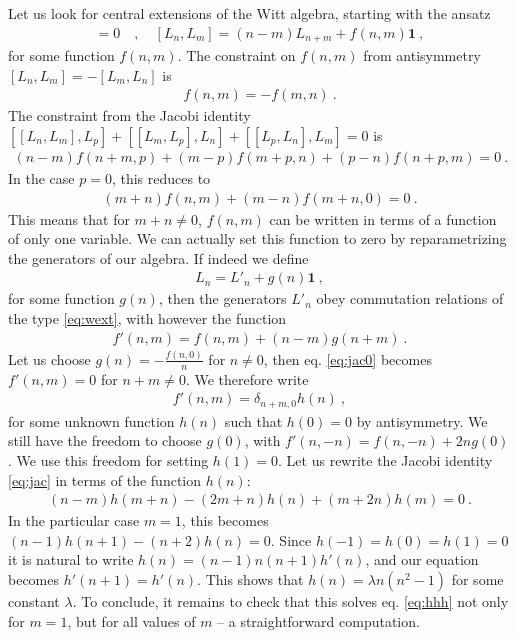 \documentclass[12pt, a4paper]{article}
\theoremstyle{break}
\begin{document}
Let us look for central extensions of the Witt algebra, starting with the ansatz
\begin{align}
  [\mathbf 1, L_n] = 0 \quad , \quad [L_n,L_m] = (n-m)L_{n+m} +f(n,m)\mathbf 1 \ ,
  \label{eq:wext}
 \end{align}
for some function $f(n,m)$. The constraint on $f(n,m)$ from antisymmetry $[L_n,L_m]=-[L_m,L_n]$ is 
\begin{align}
 f(n,m)= - f(m,n)\ .
\end{align}
The constraint from the Jacobi identity $[[L_n,L_m],L_p] + [[L_m,L_p],L_n] + [[L_p,L_n],L_m]=0$ is 
\begin{align}
 (n-m)f(n+m,p) + (m-p)f(m+p,n) + (p-n)f(n+p,m) = 0 \ .
 \label{eq:jac}
\end{align}
In the case $p=0$, this reduces to
\begin{align}
 (m+n)f(n,m)+(m-n)f(m+n,0)=0\ .
 \label{eq:jac0}
\end{align}
This means that for $m+n\neq 0$, $f(n,m)$ can be written in terms of a function of only one variable. We can actually set this function to zero by reparametrizing the generators of our algebra. If indeed we define 
\begin{align}
 L_n = L'_n + g(n) \mathbf 1\ ,
\end{align}
for some function $g(n)$, then the generators $L'_n$ obey commutation relations of the type \eqref{eq:wext}, with however the function 
\begin{align}
 f'(n,m) = f(n, m)+(n-m)g(n+m)\ .
\end{align}
Let us choose $g(n) = -\frac{f(n,0)}{n}$ for $n\neq 0$, then eq. \eqref{eq:jac0} becomes $f'(n,m)=0$ for $n+m\neq 0$. We therefore write 
\begin{align}
 f'(n,m) = \delta_{n+m,0}h(n)\ , 
\end{align}
for some unknown function $h(n)$ such that $h(0)=0$ by antisymmetry. We still have the freedom to choose $g(0)$, with $f'(n,-n) = f(n,-n) + 2ng(0)$. We use this freedom for setting $h(1)=0$. Let us rewrite the Jacobi identity \eqref{eq:jac} in terms of the function $h(n)$:
\begin{align}
 (n-m)h(m+n) -(2m+n)h(n) +(m+2n)h(m) = 0\ .
 \label{eq:hhh}
\end{align}
In the particular case $m=1$, this becomes $(n-1)h(n+1) - (n+2)h(n)=0$. Since $h(-1)=h(0)=h(1)=0$ it is natural to write $h(n) = (n-1)n(n+1) h'(n)$, and our equation becomes $h'(n+1)=h'(n)$.  This shows that $h(n)=\lambda n(n^2-1)$ for some constant $\lambda$. To conclude, it remains to check that this solves eq. \eqref{eq:hhh} not only for $m=1$, but for all values of $m$ -- a straightforward computation.
\end{document}
